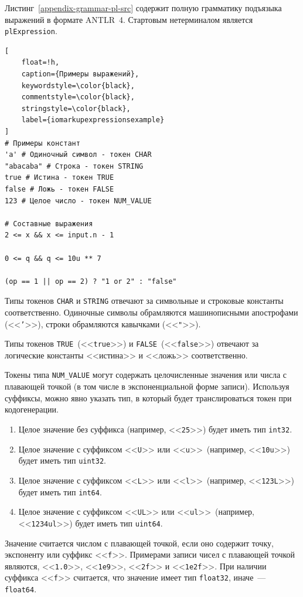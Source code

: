 \documentclass[times,specification,annotation]{style/itmo-student-thesis/itmo-student-thesis}
\begin{document}
Листинг~\ref{appendix-grammar-pl-src} содержит полную грамматику подъязыка выражений в формате ANTLR~4. Стартовым нетерминалом является \texttt{plExpression}. 

\begin{lstlisting}[
    float=!h,
    caption={Примеры выражений},
    keywordstyle=\color{black},
    commentstyle=\color{black},
    stringstyle=\color{black},
    label={iomarkupexpressionsexample}
]
# Примеры констант
'a' # Одиночный символ - токен CHAR
"abacaba" # Строка - токен STRING
true # Истина - токен TRUE
false # Ложь - токен FALSE
123 # Целое число - токен NUM_VALUE

# Составные выражения
2 <= x && x <= input.n - 1

0 <= q && q <= 10u ** 7

(op == 1 || op == 2) ? "1 or 2" : "false"
\end{lstlisting}

Типы токенов \texttt{CHAR} и \texttt{STRING} отвечают за символьные и строковые константы соответственно. Одиночные символы обрамляются машинописными апострофами (<<\texttt{'}>>), строки обрамляются кавычками (<<\texttt{"}>>).

Типы токенов \texttt{TRUE}~(<<\texttt{true}>>) и \texttt{FALSE}~(<<\texttt{false}>>) отвечают за логические константы <<истина>> и <<ложь>> соответственно.

Токены типа \texttt{NUM\_VALUE} могут содержать целочисленные значения или числа с плавающей точкой (в том числе в экспоненциальной форме записи). Используя суффиксы, можно явно указать тип, в который будет транслироваться токен при кодогенерации.

\begin{enumerate}[leftmargin=1.75cm]
    \item Целое значение без суффикса (например, <<\texttt{25}>>) будет иметь тип \texttt{int32}.
    \item Целое значение с суффиксом <<\texttt{U}>> или <<\texttt{u}>>~(например, <<\texttt{10u}>>) будет иметь тип \texttt{uint32}.
    \item Целое значение с суффиксом <<\texttt{L}>> или <<\texttt{l}>>~(например, <<\texttt{123L}>>) будет иметь тип \texttt{int64}.
    \item Целое значение с суффиксом <<\texttt{UL}>> или <<\texttt{ul}>>~(например, <<\texttt{1234ul}>>) будет иметь тип \texttt{uint64}.
\end{enumerate}

Значение считается числом с плавающей точкой, если оно содержит точку, экспоненту или суффикс <<\texttt{f}>>. Примерами записи чисел с плавающей точкой являются, <<\texttt{1.0}>>, <<\texttt{1e9}>>, <<\texttt{2f}>> и <<\texttt{1e2f}>>. При наличии суффикса <<\texttt{f}>> считается, что значение имеет тип \texttt{float32}, иначе~--- \texttt{float64}.
\end{document}
